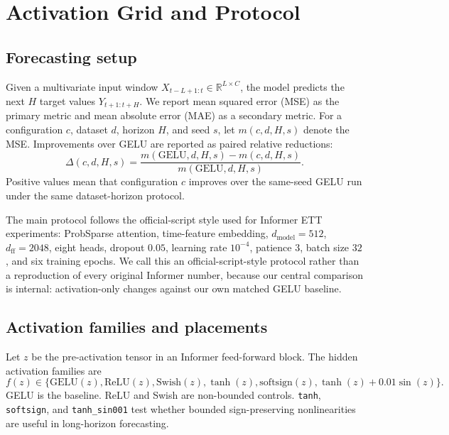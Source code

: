 \section{Activation Grid and Protocol}

\subsection{Forecasting setup}

Given a multivariate input window \(X_{t-L+1:t}\in\mathbb{R}^{L\times C}\), the model predicts the next \(H\) target values \(Y_{t+1:t+H}\). We report mean squared error (MSE) as the primary metric and mean absolute error (MAE) as a secondary metric. For a configuration \(c\), dataset \(d\), horizon \(H\), and seed \(s\), let \(m(c,d,H,s)\) denote the MSE. Improvements over GELU are reported as paired relative reductions:
\begin{equation}
    \Delta(c,d,H,s)
    =
    \frac{m(\mathrm{GELU},d,H,s)-m(c,d,H,s)}
         {m(\mathrm{GELU},d,H,s)}.
\end{equation}
Positive values mean that configuration \(c\) improves over the same-seed GELU run under the same dataset-horizon protocol.

The main protocol follows the official-script style used for Informer ETT experiments: ProbSparse attention, time-feature embedding, \(d_{\mathrm{model}}=512\), \(d_{\mathrm{ff}}=2048\), eight heads, dropout \(0.05\), learning rate \(10^{-4}\), patience \(3\), batch size \(32\), and six training epochs. We call this an official-script-style protocol rather than a reproduction of every original Informer number, because our central comparison is internal: activation-only changes against our own matched GELU baseline.

\subsection{Activation families and placements}

Let \(z\) be the pre-activation tensor in an Informer feed-forward block. The hidden activation families are
\begin{equation}
    f(z) \in
    \{\mathrm{GELU}(z),\mathrm{ReLU}(z),\mathrm{Swish}(z),
      \tanh(z),\mathrm{softsign}(z),\tanh(z)+0.01\sin(z)\}.
\end{equation}
GELU is the baseline. ReLU and Swish are non-bounded controls. \texttt{tanh}, \texttt{softsign}, and \texttt{tanh\_sin001} test whether bounded sign-preserving nonlinearities are useful in long-horizon forecasting.

